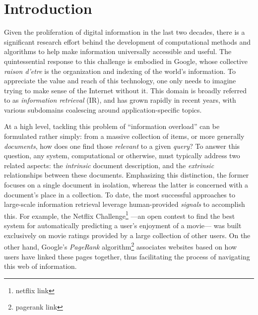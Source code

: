 

\graphicspath{{1/figures/}}

\chapter{Introduction}
\label{chp:introduction}

Given the proliferation of digital information in the last two decades, there is a significant research effort behind the development of computational methods and algorithms to help make information universally accessible and useful. %
The quintessential response to this challenge is embodied in Google, whose collective \emph{raison d'etre} is the organization and indexing of the world's information.
To appreciate the value and reach of this technology, one only needs to imagine trying to make sense of the Internet without it.
This domain is broadly referred to as \emph{information retrieval} (IR), and has grown rapidly in recent years, with various subdomains coalescing around application-specific topics.

At a high level, tackling this problem of ``information overload'' can be formulated rather simply: from a massive collection of items, or more generally \emph{documents}, how does one find those \emph{relevant} to a given \emph{query}?
To answer this question, any system, computational or otherwise, must typically address two related aspects: the \emph{intrinsic} document description, and the \emph{extrinsic} relationships between these documents.
Emphasizing this distinction, the former focuses on a single document in isolation, whereas the latter is concerned with a document's place in a collection.
To date, the most successful approaches to large-scale information retrieval leverage human-provided \emph{signals} to accomplish this.
For example, the Netflix Challenge\footnote{netflix link} ---an open contest to find the best system for automatically predicting a user's enjoyment of a movie--- was built exclusively on movie ratings provided by a large collection of other users.
On the other hand, Google's \emph{PageRank} algorithm\footnote{pagerank link} associates websites based on how users have linked these pages together, thus facilitating the process of navigating this web of information.

